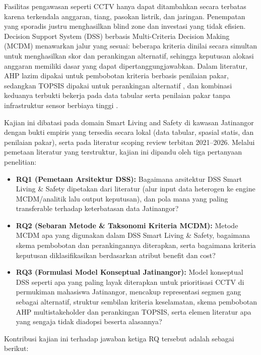 \documentclass[conference]{IEEEtran}
\begin{document}
Fasilitas pengawasan seperti CCTV hanya dapat ditambahkan secara terbatas karena terkendala anggaran, tiang, pasokan listrik, dan jaringan. Penempatan yang sporadis justru menghasilkan blind zone dan investasi yang tidak efisien. Decision Support System (DSS) berbasis Multi-Criteria Decision Making (MCDM) menawarkan jalur yang sesuai: beberapa kriteria dinilai secara simultan untuk menghasilkan skor dan perankingan alternatif, sehingga keputusan alokasi anggaran memiliki dasar yang dapat dipertanggungjawabkan. Dalam literatur, AHP lazim dipakai untuk pembobotan kriteria berbasis penilaian pakar, sedangkan TOPSIS dipakai untuk perankingan alternatif \cite{kanj2024}, dan kombinasi keduanya terbukti bekerja pada data tabular serta penilaian pakar tanpa infrastruktur sensor berbiaya tinggi \cite{baddour2026}.

Kajian ini dibatasi pada domain Smart Living and Safety di kawasan Jatinangor dengan bukti empiris yang tersedia secara lokal (data tabular, spasial statis, dan penilaian pakar), serta pada literatur scoping review terbitan 2021--2026. Melalui pemetaan literatur yang terstruktur, kajian ini dipandu oleh tiga pertanyaan penelitian:

\begin{itemize}
\item \textbf{RQ1 (Pemetaan Arsitektur DSS):} Bagaimana arsitektur DSS Smart Living \& Safety dipetakan dari literatur (alur input data heterogen ke engine MCDM/analitik lalu output keputusan), dan pola mana yang paling transferable terhadap keterbatasan data Jatinangor?
\item \textbf{RQ2 (Sebaran Metode \& Taksonomi Kriteria MCDM):} Metode MCDM apa yang digunakan dalam DSS Smart Living \& Safety, bagaimana skema pembobotan dan perankingannya diterapkan, serta bagaimana kriteria keputusan diklasifikasikan berdasarkan atribut benefit dan cost?
\item \textbf{RQ3 (Formulasi Model Konseptual Jatinangor):} Model konseptual DSS seperti apa yang paling layak diterapkan untuk prioritisasi CCTV di permukiman mahasiswa Jatinangor, mencakup representasi segmen gang sebagai alternatif, struktur sembilan kriteria keselamatan, skema pembobotan AHP multistakeholder dan perankingan TOPSIS, serta elemen literatur apa yang sengaja tidak diadopsi beserta alasannya?
\end{itemize}

Kontribusi kajian ini terhadap jawaban ketiga RQ tersebut adalah sebagai berikut:
\end{document}
